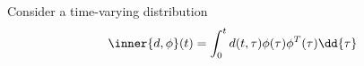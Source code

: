 \documentclass{my-handout}
\DeclarePairedDelimiter{\inner}\langle\rangle
\begin{document}
\maketitle

Consider a time-varying distribution
\begin{equation*}
	\inner{d, \phi}(t) = \int_0^t d(t, \tau) \phi(\tau) \phi^T(\tau) \dd{\tau}
\end{equation*}



\end{document}
